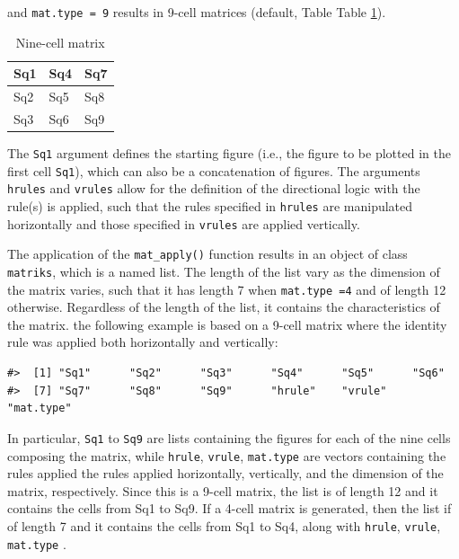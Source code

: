 and \texttt{mat.type\ =\ 9} results in 9-cell matrices (default, Table Table \ref{tab:nineCell-static}).

\begin{table}

\caption{\label{tab:nineCell-static}Nine-cell matrix}
\centering
\begin{tabular}[t]{l|l|l}
\hline
Sq1 & Sq4 & Sq7\\
\hline
Sq2 & Sq5 & Sq8\\
\hline
Sq3 & Sq6 & Sq9\\
\hline
\end{tabular}
\end{table}

The \texttt{Sq1} argument defines the starting figure (i.e., the figure to be plotted in the first cell \texttt{Sq1}), which can also be a concatenation of figures. The arguments \texttt{hrules} and \texttt{vrules} allow for the definition of the directional logic with the rule(s) is applied, such that the rules specified in \texttt{hrules} are manipulated horizontally and those specified in \texttt{vrules} are applied vertically.

The application of the \texttt{mat\_apply()} function results in an object of class \texttt{matriks}, which is a named list. The length of the list vary as the dimension of the matrix varies, such that it has length 7 when \texttt{mat.type\ =4} and of length 12 otherwise. Regardless of the length of the list, it contains the characteristics of the matrix. the following example is based on a 9-cell matrix where the identity rule was applied both horizontally and vertically:

\begin{verbatim}
#>  [1] "Sq1"      "Sq2"      "Sq3"      "Sq4"      "Sq5"      "Sq6"     
#>  [7] "Sq7"      "Sq8"      "Sq9"      "hrule"    "vrule"    "mat.type"
\end{verbatim}

In particular, \texttt{Sq1} to \texttt{Sq9} are lists containing the figures for each of the nine cells composing the matrix, while \texttt{hrule}, \texttt{vrule}, \texttt{mat.type} are vectors containing the rules applied the rules applied horizontally, vertically, and the dimension of the matrix, respectively. Since this is a 9-cell matrix, the list is of length 12 and it contains the cells from Sq1 to Sq9. If a 4-cell matrix is generated, then the list if of length 7 and it contains the cells from Sq1 to Sq4, along with \texttt{hrule}, \texttt{vrule}, \texttt{mat.type} .


